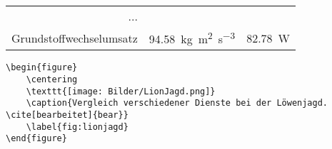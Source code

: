 \begin{frame}[fragile]
	\Losung
	\begin{outputbox}
		\begin{centering}
			\begin{tabular}{rcc}
				...&&\\
				Grundstoffwechselumsatz	&	\SI{94.58 }{\kg\metre\tothe{2}\per\second\tothe{3}}	\cite{HAGRLowe}		&	\SI{82.78}{\watt}	\cite{HAGRMensch}
			\end{tabular}
		\end{centering}
	\end{outputbox}
	\Code
	\begin{lstlisting}
\begin{figure}
	\centering
	\texttt{[image: Bilder/LionJagd.png]}
	\caption{Vergleich verschiedener Dienste bei der Löwenjagd. \cite[bearbeitet]{bear}}
	\label{fig:lionjagd}
\end{figure}
	\end{lstlisting}
\end{frame}
